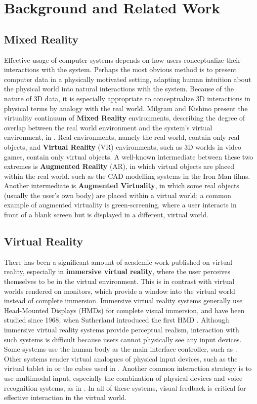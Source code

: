 \documentclass[pageno]{jpaper}
\begin{document}
\section{Background and Related Work}
\subsection{Mixed Reality}
Effective usage of computer systems depends on how users conceptualize their interactions with the system.
Perhaps the most obvious method is to present computer data in a physically motivated setting, adapting
human intuition about the physical world into natural interactions with the system. Because of the nature of 3D data,
it is especially appropriate to conceptualize 3D interactions in physical terms by analogy with the real world. Milgram and Kishino present
the virtuality continuum of {\bf Mixed Reality} environments, describing the degree of overlap between the
real world environment and the system's virtual environment, in \cite{milgram1994taxonomy}. Real environments, namely
the real world, contain only real objects, and {\bf Virtual Reality} (VR) environments, such as 3D worlds in video games, contain only
virtual objects. A well-known intermediate between these two extremes is {\bf Augmented Reality} (AR), in which virtual
objects are placed within the real world. such as the CAD modelling systems in the Iron Man films. Another intermediate is
{\bf Augmented Virtuality}, in which some real objects (usually the user's own body) are placed within a virtual world; a common
example of augmented virtuality is green-screening, where a user interacts in front of a blank screen but is displayed in a
different, virtual world.

\subsection{Virtual Reality}
There has been a significant amount of academic work published on virtual reality, especially
in {\bf immersive virtual reality}, where the user perceives themselves to be in the virtual environment. This is in
contrast with virtual worlds rendered on monitors, which provide a window into the virtual world instead of complete immersion.
Immersive
virtual reality systems generally use Head-Mounted Displays (HMDs) for complete visual immersion, and have been studied
since 1968, when Sutherland introduced the first HMD \cite{sutherland1968head}. Although immersive virtual reality
systems provide perceptual realism, interaction with such systems is difficult because users cannot physically see any input devices.
Some systems use the human body as the main interface controller, such as \cite{laviola1999whole, laviola1999flex}. Other systems render
virtual analogues of physical input devices, such as the virtual tablet in \cite{poupyrev1998virtual} or the cubes used in \cite{mine1997exploiting}.
Another common interaction strategy is to use multimodal input, especially the combination of physical devices and voice recognition systems, as in \cite{bolt1980put}.
In all of these systems, visual feedback is critical for effective interaction in the virtual world.
\end{document}
